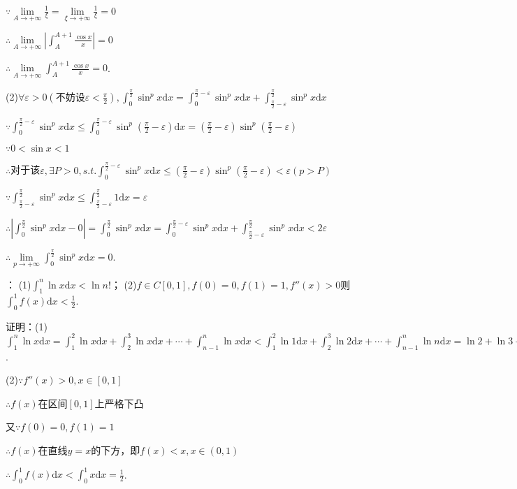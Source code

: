 \documentclass[12pt,UTF8]{ctexart}
\begin{document}
\begin{enumerate}
$\because\lim\limits_{A\rightarrow+\infty}\frac1\xi=\lim\limits_{\xi\rightarrow+\infty}\frac1\xi=0$

$\therefore\lim\limits_{A\rightarrow+\infty}|\int_A^{A+1}\frac{\cos x}x|=0$

$\therefore\lim\limits_{A\rightarrow+\infty}\int_A^{A+1}\frac{\cos x}x=0$.

(2)$\forall\varepsilon>0(\text{不妨设}\varepsilon<\frac\pi2),\int_0^{\frac\pi2}\sin^px\mathrm dx=\int_0^{\frac\pi2-\varepsilon}\sin^px\mathrm dx+\int_{\frac\pi2-\varepsilon}^{\frac\pi2}\sin^px\mathrm dx$

$\because\int_0^{\frac\pi2-\varepsilon}\sin^px\mathrm dx\leq\int_0^{\frac\pi2-\varepsilon}\sin^p(\frac\pi2-\varepsilon)\mathrm dx=(\frac\pi2-\varepsilon)\sin^p(\frac\pi2-\varepsilon)$

$\because0<\sin x<1$

$\therefore$对于该$\varepsilon,\exists P>0,s.t.\int_0^{\frac\pi2-\varepsilon}\sin^px\mathrm dx\leq(\frac\pi2-\varepsilon)\sin^p(\frac\pi2-\varepsilon)<\varepsilon(p>P)$

$\because\int_{\frac\pi2-\varepsilon}^{\frac\pi2}\sin^px\mathrm dx\leq\int_{\frac\pi2-\varepsilon}^{\frac\pi2}1\mathrm dx=\varepsilon$

$\therefore|\int_0^{\frac\pi2}\sin^px\mathrm dx-0|=\int_0^{\frac\pi2}\sin^px\mathrm dx=\int_0^{\frac\pi2-\varepsilon}\sin^px\mathrm dx+\int_{\frac\pi2-\varepsilon}^{\frac\pi2}\sin^px\mathrm dx<2\varepsilon$

$\therefore\lim\limits_{p\rightarrow+\infty}\int_0^{\frac\pi2}\sin^px\mathrm dx=0$.

：
\newline
(1)$\int_1^n\ln x\mathrm dx<\ln n!$；
\newline
(2)$f\in C[0,1],f(0)=0,f(1)=1,f''(x)>0$则$\int_0^1f(x)\mathrm dx<\frac12$.

证明：(1)$\int_1^n\ln x\mathrm dx=\int_1^2\ln x\mathrm dx+\int_2^3\ln x\mathrm dx+\cdots+\int_{n-1}^n\ln x\mathrm dx<\int_1^2\ln 1\mathrm dx+\int_2^3\ln 2\mathrm dx+\cdots+\int_{n-1}^n\ln n\mathrm dx=\ln 2+\ln 3+\cdots+\ln n=\ln n!$.

(2)$\because f''(x)>0,x\in[0,1]$

$\therefore f(x)$在区间$[0,1]$上严格下凸

又$\because f(0)=0,f(1)=1$

$\therefore f(x)$在直线$y=x$的下方，即$f(x)<x,x\in(0,1)$

$\therefore\int_0^1f(x)\mathrm dx<\int_0^1x\mathrm dx=\frac12$.
\end{enumerate}
\end{document}

